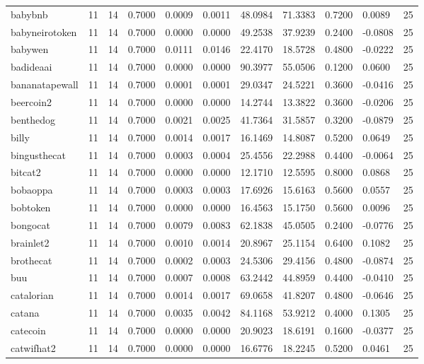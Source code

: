 \begin{table}[htbp]
\begin{tabular}{lllllllllll}
babybnb & 11 & 14 & 0.7000 & 0.0009 & 0.0011 & 48.0984 & 71.3383 & 0.7200 & 0.0089 & 25 \\
babyneirotoken & 11 & 14 & 0.7000 & 0.0000 & 0.0000 & 49.2538 & 37.9239 & 0.2400 & -0.0808 & 25 \\
babywen & 11 & 14 & 0.7000 & 0.0111 & 0.0146 & 22.4170 & 18.5728 & 0.4800 & -0.0222 & 25 \\
badideaai & 11 & 14 & 0.7000 & 0.0000 & 0.0000 & 90.3977 & 55.0506 & 0.1200 & 0.0600 & 25 \\
bananatapewall & 11 & 14 & 0.7000 & 0.0001 & 0.0001 & 29.0347 & 24.5221 & 0.3600 & -0.0416 & 25 \\
beercoin2 & 11 & 14 & 0.7000 & 0.0000 & 0.0000 & 14.2744 & 13.3822 & 0.3600 & -0.0206 & 25 \\
benthedog & 11 & 14 & 0.7000 & 0.0021 & 0.0025 & 41.7364 & 31.5857 & 0.3200 & -0.0879 & 25 \\
billy & 11 & 14 & 0.7000 & 0.0014 & 0.0017 & 16.1469 & 14.8087 & 0.5200 & 0.0649 & 25 \\
bingusthecat & 11 & 14 & 0.7000 & 0.0003 & 0.0004 & 25.4556 & 22.2988 & 0.4400 & -0.0064 & 25 \\
bitcat2 & 11 & 14 & 0.7000 & 0.0000 & 0.0000 & 12.1710 & 12.5595 & 0.8000 & 0.0868 & 25 \\
bobaoppa & 11 & 14 & 0.7000 & 0.0003 & 0.0003 & 17.6926 & 15.6163 & 0.5600 & 0.0557 & 25 \\
bobtoken & 11 & 14 & 0.7000 & 0.0000 & 0.0000 & 16.4563 & 15.1750 & 0.5600 & 0.0096 & 25 \\
bongocat & 11 & 14 & 0.7000 & 0.0079 & 0.0083 & 62.1838 & 45.0505 & 0.2400 & -0.0776 & 25 \\
brainlet2 & 11 & 14 & 0.7000 & 0.0010 & 0.0014 & 20.8967 & 25.1154 & 0.6400 & 0.1082 & 25 \\
brothecat & 11 & 14 & 0.7000 & 0.0002 & 0.0003 & 24.5306 & 29.4156 & 0.4800 & -0.0874 & 25 \\
buu & 11 & 14 & 0.7000 & 0.0007 & 0.0008 & 63.2442 & 44.8959 & 0.4400 & -0.0410 & 25 \\
catalorian & 11 & 14 & 0.7000 & 0.0014 & 0.0017 & 69.0658 & 41.8207 & 0.4800 & -0.0646 & 25 \\
catana & 11 & 14 & 0.7000 & 0.0035 & 0.0042 & 84.1168 & 53.9212 & 0.4000 & 0.1305 & 25 \\
catecoin & 11 & 14 & 0.7000 & 0.0000 & 0.0000 & 20.9023 & 18.6191 & 0.1600 & -0.0377 & 25 \\
catwifhat2 & 11 & 14 & 0.7000 & 0.0000 & 0.0000 & 16.6776 & 18.2245 & 0.5200 & 0.0461 & 25 \\

\end{tabular}
\end{table}
